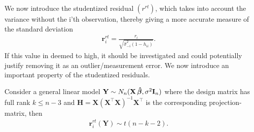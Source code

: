 We now introduce the studentized residual $(r^{rt})$, which takes into account the variance without the i'th observation, thereby giving a more accurate measure of the standard deviation
\begin{align*}
    \textbf{r}_i^{rt} = \frac{r_i}{\sqrt{\hat{\sigma}^2_{-i}(1-h_{ii})}}.
\end{align*}
If this value in deemed to high, it should be investigated and could potentially justify removing it as an outlier/measurement error. We now introduce an important property of the studentized residuals.

\begin{proposition}
    Consider a general linear model $\textbf{Y} \sim N_n(\textbf{X} \operatorname{\boldsymbol{\hat{\beta}}}, \sigma^2 \textbf{I}_n)$ where the design matrix has full rank $k \leq n-3$ and $\textbf{H} = \textbf{X} (\textbf{X}^\top \textbf{X})^{-1}\textbf{X}^\top$ is the corresponding projection-matrix, then
    \begin{align*}
        \textbf{r}_i^{rt}(\textbf{Y}) \sim t(n-k-2).
    \end{align*}
\end{proposition}
